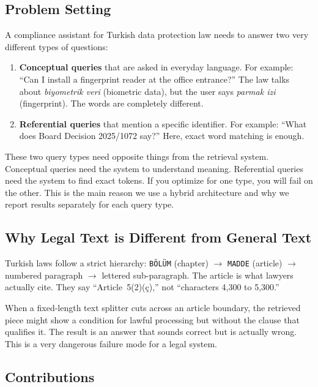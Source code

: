 \documentclass[11pt,a4paper,twocolumn]{article}
\begin{document}
\subsection{Problem Setting}

A compliance assistant for Turkish data protection law needs to answer two very different types of questions:

\begin{enumerate}[leftmargin=*]
  \item \textbf{Conceptual queries} that are asked in everyday language. For example: ``Can I install a fingerprint reader at the office entrance?'' The law talks about \textit{biyometrik veri} (biometric data), but the user says \textit{parmak izi} (fingerprint). The words are completely different.
  \item \textbf{Referential queries} that mention a specific identifier. For example: ``What does Board Decision 2025/1072 say?'' Here, exact word matching is enough.
\end{enumerate}

These two query types need opposite things from the retrieval system. Conceptual queries need the system to understand meaning. Referential queries need the system to find exact tokens. If you optimize for one type, you will fail on the other. This is the main reason we use a hybrid architecture and why we report results separately for each query type.

\subsection{Why Legal Text is Different from General Text}

Turkish laws follow a strict hierarchy: \texttt{BÖLÜM} (chapter) $\rightarrow$ \texttt{MADDE} (article) $\rightarrow$ numbered paragraph $\rightarrow$ lettered sub-paragraph. The article is what lawyers actually cite. They say ``Article~5(2)(ç),'' not ``characters 4,300 to 5,300.''

When a fixed-length text splitter cuts across an article boundary, the retrieved piece might show a condition for lawful processing but without the clause that qualifies it. The result is an answer that sounds correct but is actually wrong. This is a very dangerous failure mode for a legal system.

\subsection{Contributions}
\end{document}
